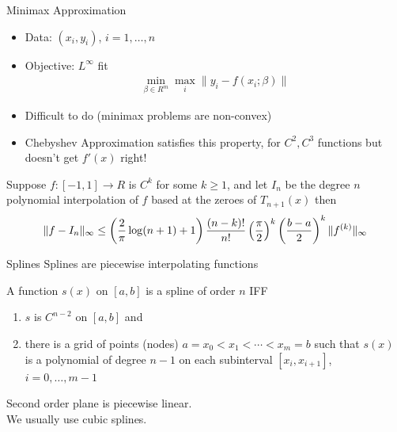 \documentclass[xcolor=pdftex,dvipsnames,table,mathserif]{beamer}
\begin{document}
\begin{frame}{Minimax Approximation}
\begin{itemize}
\item Data: $(x_i,y_i)$, $i=1,\ldots,n$
\item Objective: $L^{\infty}$ fit
\begin{eqnarray*}
\min_{\beta \in R^m} \max_{i} \| y_i - f(x_i; \beta) \|
\end{eqnarray*}
\item Difficult to do (minimax problems are non-convex)
\item Chebyshev Approximation satisfies this property, for $C^2,C^3$ functions but doesn't get $f'(x)$ right!
\end{itemize}
\begin{theorem}
Suppose $f: [-1,1] \rightarrow R$ is $C^k$ for some $k \geq 1$, and let $I_n$ be the degree $n$ polynomial interpolation of $f$ based at the zeroes of $T_{n+1}(x)$ then
\begin{eqnarray*}
\tiny
\| f - I_n \|_{\infty} \leq \left(\frac{2}{\pi}  \log(n+1) + 1 \right) \frac{(n-k)!}{n!} \left ( \frac{\pi}{2}\right)^k  \left ( \frac{b-a}{2}\right)^k \| f^{(k)} \|_{\infty}
\end{eqnarray*}
\end{theorem}
\end{frame}


\begin{frame}{Splines}
Splines are piecewise interpolating functions
\begin{definition} 
A function $s(x)$ on $[a,b]$ is a spline of order $n$ IFF
\begin{enumerate}
\item $s$ is $C^{n-2}$ on $[a,b]$ and 
\item there is a grid of points (nodes) $a = x_0 < x_1 < \cdots < x_m = b$ such that $s(x)$ is a polynomial of degree $n-1$ on each subinterval $[x_i, x_{i+1}]$, $i = 0,\ldots,m-1$
\end{enumerate}
\end{definition}
Second order plane is piecewise linear.\\
We usually use cubic splines.
\end{frame}
\end{document}
